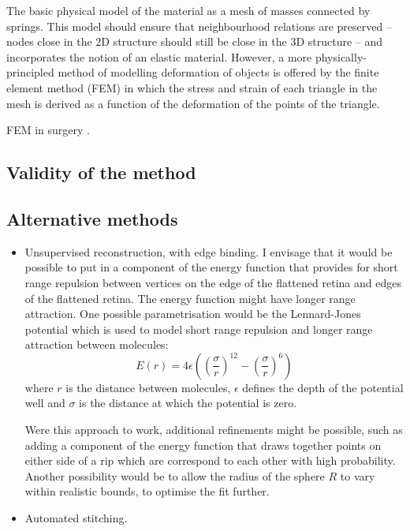 \documentclass{article}
\begin{document}
The basic physical model of the material as a mesh of masses connected
by springs. This model should ensure that neighbourhood relations are
preserved -- nodes close in the 2D structure should still be close in
the 3D structure -- and incorporates the notion of an elastic
material. However, a more physically-principled method of modelling
deformation of objects is offered by the finite element method (FEM)
in which the stress and strain of each triangle in the mesh is derived
as a function of the deformation of the points of the
triangle. 

FEM in surgery \citep{CartEtal05appl}.

\subsection{Validity of the method}
\label{fold-sphere:sec:validity-method}

\subsection{Alternative methods}
\label{fold-sphere:sec:alternative-methods}

\begin{itemize}
\item Unsupervised reconstruction, with edge binding.  I envisage that
  it would be possible to put in a component of the energy function
  that provides for short range repulsion between vertices on the edge
  of the flattened retina and edges of the flattened retina. The
  energy function might have longer range attraction. One possible
  parametrisation would be the Lennard-Jones potential which is used
  to model short range repulsion and longer range attraction between
  molecules:
  \begin{equation}
    \label{fold-sphere:eq:4}
    E(r) = 4\epsilon\left(\left(\frac{\sigma}{r}\right)^{12}-
      \left(\frac{\sigma}{r}\right)^{6}\right)
  \end{equation}
  where $r$ is the distance between molecules, $\epsilon$ defines the
  depth of the potential well and $\sigma$ is the distance at which the
  potential is zero.

  Were this approach to work, additional refinements might be possible,
  such as adding a component of the energy function that draws together
  points on either side of a rip which are correspond to each other with
  high probability. Another possibility would be to allow the radius of
  the sphere $R$ to vary within realistic bounds, to optimise the fit
  further.
\item Automated stitching.
\end{itemize}
\end{document}

